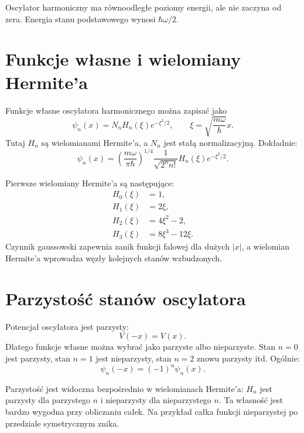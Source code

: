 \begin{summarybox}
Oscylator harmoniczny ma równoodległe poziomy energii, ale nie zaczyna od zera. Energia stanu podstawowego wynosi \(\hbar\omega/2\).
\end{summarybox}

\section{Funkcje własne i wielomiany Hermite'a}

Funkcje własne oscylatora harmonicznego można zapisać jako
\begin{equation}
    \psi_n(x)=N_n H_n(\xi)e^{-\xi^2/2},
    \qquad
    \xi=\sqrt{\frac{m\omega}{\hbar}}x.
\end{equation}
Tutaj \(H_n\) są wielomianami Hermite'a, a \(N_n\) jest stałą normalizacyjną. Dokładnie:
\begin{equation}
    \psi_n(x)=\left(\frac{m\omega}{\pi\hbar}\right)^{1/4}\frac{1}{\sqrt{2^n n!}}H_n(\xi)e^{-\xi^2/2}.
\end{equation}

Pierwsze wielomiany Hermite'a są następujące:
\begin{align}
    H_0(\xi)&=1,\\
    H_1(\xi)&=2\xi,\\
    H_2(\xi)&=4\xi^2-2,\\
    H_3(\xi)&=8\xi^3-12\xi.
\end{align}
Czynnik gaussowski zapewnia zanik funkcji falowej dla dużych \(|x|\), a wielomian Hermite'a wprowadza węzły kolejnych stanów wzbudzonych.

\section{Parzystość stanów oscylatora}

Potencjał oscylatora jest parzysty:
\begin{equation}
    V(-x)=V(x).
\end{equation}
Dlatego funkcje własne można wybrać jako parzyste albo nieparzyste. Stan \(n=0\) jest parzysty, stan \(n=1\) jest nieparzysty, stan \(n=2\) znowu parzysty itd. Ogólnie:
\begin{equation}
    \psi_n(-x)=(-1)^n\psi_n(x).
\end{equation}

Parzystość jest widoczna bezpośrednio w wielomianach Hermite'a: \(H_n\) jest parzysty dla parzystego \(n\) i nieparzysty dla nieparzystego \(n\). Ta własność jest bardzo wygodna przy obliczaniu całek. Na przykład całka funkcji nieparzystej po przedziale symetrycznym znika.

